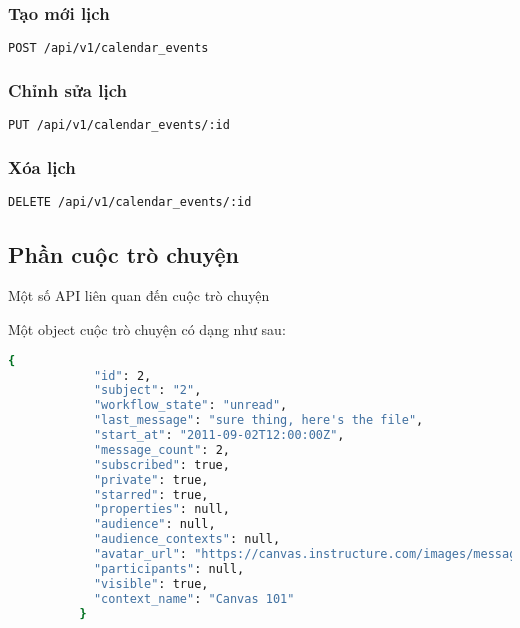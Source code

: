 \documentclass[../Thesis.tex]{subfiles}
\begin{document}
          \subsubsection{Tạo mới lịch}
          \begin{lstlisting}[language=bash]
            POST /api/v1/calendar_events
          \end{lstlisting}

          \subsubsection{Chỉnh sửa lịch}
          \begin{lstlisting}[language=bash]
            PUT /api/v1/calendar_events/:id
          \end{lstlisting}

          \subsubsection{Xóa lịch}
          \begin{lstlisting}[language=bash]
            DELETE /api/v1/calendar_events/:id
          \end{lstlisting}

      \subsection{Phần cuộc trò chuyện}

          Một số API liên quan đến cuộc trò chuyện

          Một object cuộc trò chuyện có dạng như sau:

          \begin{lstlisting}[language=bash]
            {
            "id": 2,
            "subject": "2",
            "workflow_state": "unread",
            "last_message": "sure thing, here's the file",
            "start_at": "2011-09-02T12:00:00Z",
            "message_count": 2,
            "subscribed": true,
            "private": true,
            "starred": true,
            "properties": null,
            "audience": null,
            "audience_contexts": null,
            "avatar_url": "https://canvas.instructure.com/images/messages/avatar-group-50.png",
            "participants": null,
            "visible": true,
            "context_name": "Canvas 101"
          }

          \end{lstlisting}
\end{document}
